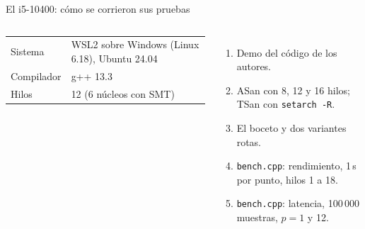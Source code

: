 \begin{frame}{El i5-10400: cómo se corrieron sus pruebas}
  \begin{columns}[T]
    \footnotesize
    \begin{tabular}{@{}>{\leavevmode\color{gris}}ll@{}}
      Sistema & WSL2 sobre Windows (Linux 6.18), Ubuntu 24.04\\
      Compilador & g++ 13.3\\
      Hilos & 12 (6 núcleos con SMT)\\
    \end{tabular}
    \par\medskip\normalsize
    \begin{enumerate}\footnotesize
      \item Demo del código de los autores.
      \item ASan con 8, 12 y 16 hilos; TSan con \texttt{setarch -R}.
      \item El boceto y dos variantes rotas.
      \item \texttt{bench.cpp}: rendimiento, 1\,s por punto, hilos 1 a 18.
      \item \texttt{bench.cpp}: latencia, 100\,000 muestras, $p = 1$ y 12.
    \end{enumerate}
    \par\medskip
    \par\medskip
  \end{columns}
\end{frame}

